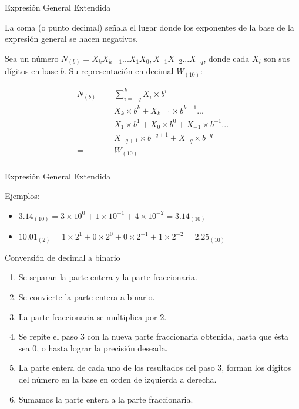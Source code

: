 \documentclass[11pt,a4paper,spanish]{beamer}
\begin{document}
\begin{frame}{Expresión General Extendida}

    La coma (o punto decimal) señala el lugar donde los exponentes de la base
    de la expresión general se hacen negativos.

    Sea un número \(N_{(b)} =
    X_{k}X_{k-1}...X_{1}X_{0},X_{-1}X_{-2}...X_{-q}\), donde cada \(X_{i}\)
    son sus dígitos en base \(b\). Su representación en decimal \(W_{(10)}\):

\begin{equation*}
\begin{aligned}
    N_{(b)} = &\sum_{i=-q}^{k} X_{i}{\times}b^{i}\\
    = &X_{k}{\times}b^{k}+X_{k-1}{\times}b^{k-1}...\\
    &X_{1}{\times}b^{1}+X_{0}{\times}b^{0}+X_{-1}{\times}b^{-1}...\\
    &X_{-q+1}{\times}b^{-q+1}+X_{-q}{\times}b^{-q}\\
    = &W_{(10)}\\
\end{aligned}
\end{equation*}
\end{frame}

\begin{frame}{Expresión General Extendida}

Ejemplos:

\begin{itemize}
    \item
        \(3.14_{(10)} =
        3{\times}10^0+1{\times}10^{-1}+4{\times}10^{-2} =
        3.14_{(10)}\)
    \item
        \(10.01_{(2)} =
        1{\times}2^1+0{\times}2^0+0{\times}2^{-1}+1{\times}2^{-2} =
        2.25_{(10)}\)
\end{itemize}
\end{frame}

\begin{frame}{Conversión de decimal a binario}
\begin{enumerate}
    \item Se separan la parte entera y la parte fraccionaria.

    \item Se convierte la parte entera a binario.

    \item La parte fraccionaria se multiplica por 2.

    \item Se repite el paso \(3\) con la nueva parte fraccionaria obtenida,
        hasta que ésta sea 0, o hasta lograr la precisión deseada.

    \item La parte entera de cada uno de los resultados del paso \(3\), forman
        los dígitos del número en la base en orden de izquierda a derecha.

    \item Sumamos la parte entera a la parte fraccionaria.

\end{enumerate}
\end{frame}
\end{document}
